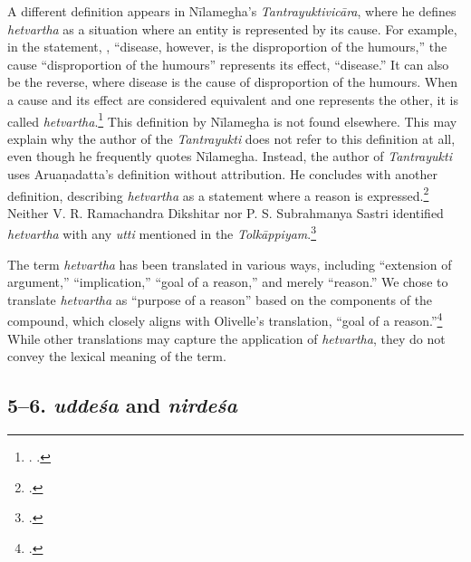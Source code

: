A different definition appears in Nīlamegha's \emph{Tantrayuktivicāra}, 
where he defines \emph{hetvartha} as a situation 
where an entity is represented by its cause. 
For example, in the statement, , 
“disease, however, is the disproportion of the humours,” 
the cause “disproportion of the humours” represents its effect, “disease.” 
It can also be the reverse, 
where disease is the cause of disproportion of the humours. 
When a cause and its effect are considered equivalent 
and one represents the other, it is called \emph{hetvartha}.\footnote{%
	\begin{verse}
	\end{verse}
	. 
		\cite[4]{muth-1976}.} 
This definition by Nīlamegha is not found elsewhere. 
This may explain why the author of the \emph{Tantrayukti} 
does not refer to this definition at all, 
even though he frequently quotes Nīlamegha. 
Instead, the author of \emph{Tantrayukti} 
uses Aruaṇadatta's definition without attribution. 
He concludes with another definition, describing \emph{hetvartha} as a 
statement 
where a reason is expressed.\footnote{%
	\begin{verse}
	\end{verse}
	\cite[8]{nara-1949}.} 
Neither V. R. Ramachandra Dikshitar nor P. S. Subrahmanya Sastri 
identified \emph{hetvartha} with any \emph{utti} 
mentioned in the \emph{Tolkāppiyam}.\footcite[84]{chev-2009} 

The term \emph{hetvartha} has been translated in various ways, 
including “extension of argument,” “implication,” 
“goal of a reason,” and merely “reason.” 
We chose to translate \emph{hetvartha} as “purpose of a reason” 
based on the components of the compound, 
which closely aligns with Olivelle’s translation,
“goal of a reason.”\footcite[436]{oliv-2013}
While other translations may capture the application of \emph{hetvartha}, 
they do not convey the lexical meaning of the term.

\subsection{5–6. \emph{uddeśa} and \emph{nirdeśa}}

